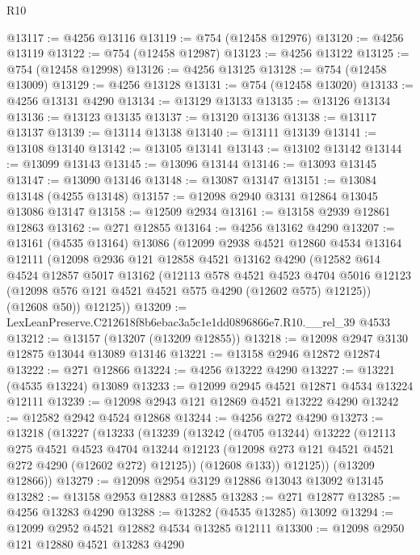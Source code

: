 \begin{lexlean}{R10}
\begin{coremodule}
@13117 := @4256 @13116
@13119 := @754 (@12458 @12976)
@13120 := @4256 @13119
@13122 := @754 (@12458 @12987)
@13123 := @4256 @13122
@13125 := @754 (@12458 @12998)
@13126 := @4256 @13125
@13128 := @754 (@12458 @13009)
@13129 := @4256 @13128
@13131 := @754 (@12458 @13020)
@13133 := @4256 @13131 @4290
@13134 := @13129 @13133
@13135 := @13126 @13134
@13136 := @13123 @13135
@13137 := @13120 @13136
@13138 := @13117 @13137
@13139 := @13114 @13138
@13140 := @13111 @13139
@13141 := @13108 @13140
@13142 := @13105 @13141
@13143 := @13102 @13142
@13144 := @13099 @13143
@13145 := @13096 @13144
@13146 := @13093 @13145
@13147 := @13090 @13146
@13148 := @13087 @13147
@13151 := @13084 @13148 (@4255 @13148)
@13157 := @12098 @2940 @3131 @12864 @13045 @13086 @13147
@13158 := @12509 @2934
@13161 := @13158 @2939 @12861 @12863
@13162 := @271 @12855
@13164 := @4256 @13162 @4290
@13207 := @13161
    (@4535 @13164)
    @13086
    (@12099
      @2938
      @4521
      @12860
      @4534
      @13164
      @12111
      (@12098
        @2936
        @121
        @12858
        @4521
        @13162
        @4290
        (@12582
          @614
          @4524
          @12857
          @5017
          @13162
          (@12113
            @578
            @4521
            @4523
            @4704
            @5016
            @12123
            (@12098 @576 @121 @4521 @4521 @575 @4290 (@12602 @575) @12125))
          (@12608 @50))
        @12125))
@13209 := LexLeanPreserve.C212618f8b6ebac3a5c1e1dd0896866e7.R10.__rel_39 @4533
@13212 := @13157 (@13207 (@13209 @12855))
@13218 := @12098 @2947 @3130 @12875 @13044 @13089 @13146
@13221 := @13158 @2946 @12872 @12874
@13222 := @271 @12866
@13224 := @4256 @13222 @4290
@13227 := @13221 (@4535 @13224) @13089
@13233 := @12099 @2945 @4521 @12871 @4534 @13224 @12111
@13239 := @12098 @2943 @121 @12869 @4521 @13222 @4290
@13242 := @12582 @2942 @4524 @12868
@13244 := @4256 @272 @4290
@13273 := @13218
    (@13227
      (@13233
        (@13239
          (@13242
            (@4705 @13244)
            @13222
            (@12113
              @275
              @4521
              @4523
              @4704
              @13244
              @12123
              (@12098 @273 @121 @4521 @4521 @272 @4290 (@12602 @272) @12125))
            (@12608 @133))
          @12125))
      (@13209 @12866))
@13279 := @12098 @2954 @3129 @12886 @13043 @13092 @13145
@13282 := @13158 @2953 @12883 @12885
@13283 := @271 @12877
@13285 := @4256 @13283 @4290
@13288 := @13282 (@4535 @13285) @13092
@13294 := @12099 @2952 @4521 @12882 @4534 @13285 @12111
@13300 := @12098 @2950 @121 @12880 @4521 @13283 @4290

\end{coremodule}
\end{lexlean}
